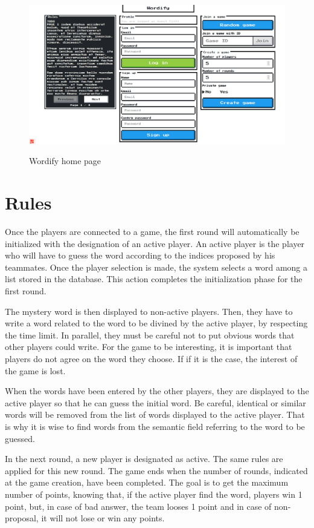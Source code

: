 \documentclass{tnreport}
\begin{document}
\begin{figure}[ht]
	\centering
	\fboxsep=1.2pt
	\includegraphics[scale=0.35]{figures/wordify_home_page}
	\label{fig:wordify_home_page}
	\caption{Wordify home page}
\end{figure} 

\clearpage

\section{Rules}

Once the players are connected to a game, the first round will automatically be initialized with the designation of an active player. An active player is the player who will have to guess the word according to the indices proposed by his teammates. Once the player selection is made, the system selects a word among a list stored in the database. This action completes the initialization phase for the first round. 

The mystery word is then displayed to non-active players. Then, they have to write a word related to the word to be divined by the active player, by respecting the time limit. In parallel, they must be careful not to put obvious words that other players could write. For the game to be interesting, it is important that players do not agree on the word they choose. If if it is the case, the interest of the game is lost. 

When the words have been entered by the other players, they are displayed to the active player so that he can guess the initial word. Be careful, identical or similar words will be removed from the list of words displayed to the active player. That is why it is wise to find words from the semantic field referring to the word to be guessed. 

In the next round, a new player is designated as active. The same rules are applied for this new round. The game ends when the number of rounds, indicated at the game creation, have been completed. The goal is to get the maximum number of points, knowing that, if the active player find the word, players win 1 point, but, in case of bad answer, the team looses 1 point and in case of non-proposal, it will not lose or win any points. 
\end{document}
